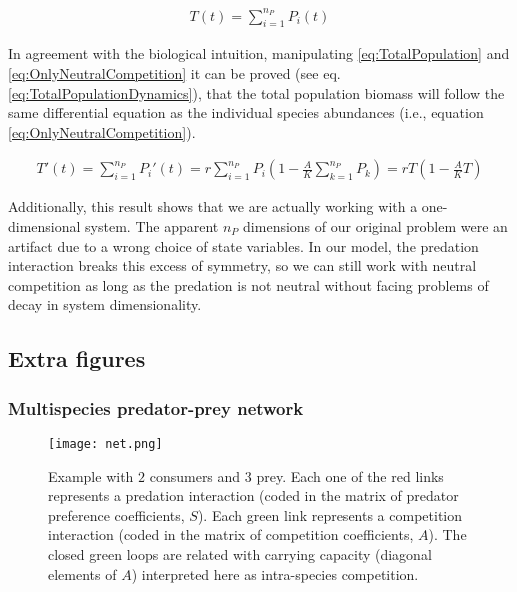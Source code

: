 \begin{eqnarray}
\label{eq:TotalPopulation}
	T(t) = \sum_{i=1}^{n_P} P_i(t)
\end{eqnarray}

In agreement with the biological intuition, manipulating \ref{eq:TotalPopulation} and \ref{eq:OnlyNeutralCompetition} it can be proved (see eq. \ref{eq:TotalPopulationDynamics}), that the total population biomass will follow the same differential equation as the individual species abundances (i.e., equation \ref{eq:OnlyNeutralCompetition}).

\begin{eqnarray}
\label{eq:TotalPopulationDynamics}
	 T'(t) = \sum_{i=1}^{n_P} P_i'(t) = r \sum_{i=1}^{n_P} P_i \left( 1 - \frac{A}{K} \sum_{k=1}^{n_P} P_k \right) = r T (1 - \frac{A}{K} T)
\end{eqnarray}

Additionally, this result shows that we are actually working with a one-dimensional system. The apparent $ n_P $ dimensions of our original problem were an artifact due to a wrong choice of state variables. In our model, the predation interaction breaks this excess of symmetry, so we can still work with neutral competition as long as the predation is not neutral without facing problems of decay in system dimensionality.


\subsection{Extra figures}
\label{subsec:ExtraFigures}

\subsubsection{Multispecies predator-prey network}
\label{subsubsec:MultispeciesPPNetwork}
\begin{figure}[H]
	\begin{center}
		\texttt{[image: net.png]}
	\end{center}
	\caption{Example with $2$ consumers and $3$ prey. Each one of the red links represents a predation interaction (coded in the matrix of predator preference coefficients, $ S $). Each green link represents a competition interaction (coded in the matrix of competition coefficients, $ A $). The closed green loops are related with carrying capacity (diagonal elements of $ A $) interpreted here as intra-species competition.}
	\label{fig:Network}
\end{figure}

